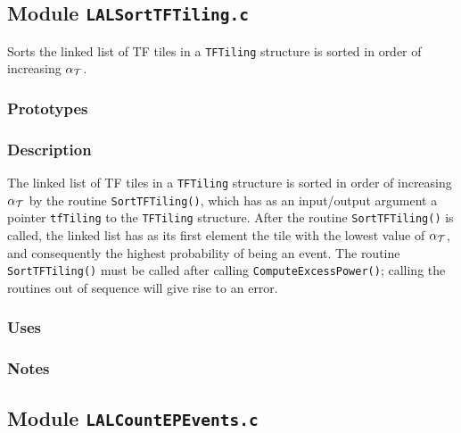 \vfill{\footnotesize}

\newpage
\subsection{Module \texttt{LALSortTFTiling.c}}
\label{ss:LALSortTFTiling.c}

Sorts the linked list of TF tiles in a \verb+TFTiling+ structure is
sorted in order of increasing $\alpha_{\cal T}$.

\subsubsection*{Prototypes}
\vspace{0.1in}


\subsubsection*{Description}

The linked list of TF tiles in a \verb+TFTiling+ structure is sorted in order
of increasing $\alpha_{\cal T}$ by the routine \verb+SortTFTiling()+, which
has as an input/output argument a pointer \verb+tfTiling+ to the
\verb+TFTiling+ structure.  After the routine \verb+SortTFTiling()+ is called,
the linked list has as its first element the tile with the lowest value of
$\alpha_{\cal T}$, and consequently the highest probability of being an event.
The routine \verb+SortTFTiling()+ must be called after calling
\verb+ComputeExcessPower()+; calling the routines out of sequence will give
rise to an error.

\subsubsection*{Uses}

\subsubsection*{Notes}

\vfill{\footnotesize}

\newpage
\subsection{Module \texttt{LALCountEPEvents.c}}
\label{ss:LALCountEPEvents.c}

